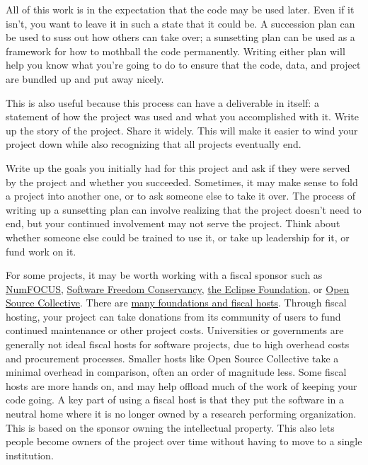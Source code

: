 \documentclass[10pt,letterpaper]{article}
\begin{document}
All of this work is in the expectation that the code may be used later.
Even if it isn't,
you want to leave it in such a state that it could be.
A succession plan can be used to suss out how others can take over;
a sunsetting plan can be used as a framework for how to mothball the code permanently.
Writing either plan will help you know what you're going to do to ensure that the code,
data,
and project are bundled up and put away nicely.

This is also useful because this process can have a deliverable in itself:
a statement of how the project was used and what you accomplished with it.
Write up the story of the project.
Share it widely.
This will make it easier to wind your project down
while also recognizing that all projects eventually end.

Write up the goals you initially had for this project
and ask if they were served by the project and whether you succeeded.
Sometimes,
it may make sense to fold a project into another one,
or to ask someone else to take it over.
The process of writing up a sunsetting plan can involve realizing that
the project doesn't need to end,
but your continued involvement may not serve the project.
Think about whether someone else could be trained to use it,
or take up leadership for it,
or fund work on it.

For some projects,
it may be worth working with a fiscal sponsor such as
\href{https://numfocus.org/}{NumFOCUS},
\href{https://sfconservancy.org/}{Software Freedom Conservancy},
\href{https://www.eclipse.org/}{the Eclipse Foundation},
or \href{https://oscollective.org/}{Open Source Collective}.
There are \href{https://sustainoss.org/academic-map/organizations/index.html}{many foundations and fiscal hosts}.
Through fiscal hosting,
your project can take donations from its community of users to fund continued maintenance or other project costs.
Universities or governments are generally not ideal fiscal hosts for software projects,
due to high overhead costs and procurement processes.
Smaller hosts like Open Source Collective take a minimal overhead in comparison,
often an order of magnitude less.
Some fiscal hosts are more hands on,
and may help offload much of the work of keeping your code going.
A key part of using a fiscal host is that
they put the software in a neutral home where it is no longer owned by a research performing organization.
This is based on the sponsor owning the intellectual property.
This also lets people become owners of the project over time
without having to move to a single institution.
\end{document}
